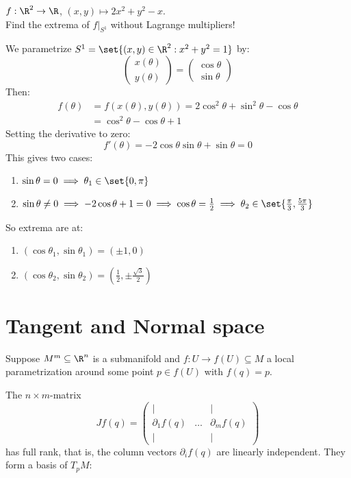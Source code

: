 \begin{example*}
$f: \R^2 \to \R$, $(x,y) \mapsto 2x^2 + y^2 - x$. \\
Find the extrema of $f|_{S^1}$ without Lagrange multipliers!

We parametrize $S^1 = \set{(x,y) \in \R^2 : x^2 + y^2 = 1}$ by:
\[ \begin{pmatrix} x(\theta) \\ y(\theta) \end{pmatrix} = \begin{pmatrix} \cos\theta \\ \sin\theta \end{pmatrix} \]
Then:
\begin{align*}
    f(\theta) &= f(x(\theta), y(\theta)) = 2\cos^2\theta + \sin^2\theta - \cos\theta \\
    &= \cos^2\theta - \cos\theta + 1
\end{align*}
Setting the derivative to zero:
\[ f'(\theta) = -2\cos\theta\sin\theta + \sin\theta = 0 \]
This gives two cases:
\begin{enumerate}
    \item $\sin\theta = 0 \implies \theta_1 \in \set{0, \pi}$
    \item $\sin\theta \ne 0 \implies -2\cos\theta + 1 = 0 \implies \cos\theta = \frac{1}{2} \implies \theta_2 \in \set{\frac{\pi}{3}, \frac{5\pi}{3}}$
\end{enumerate}
So extrema are at:
\begin{enumerate}
    \item $(\cos\theta_1, \sin\theta_1) = (\pm 1, 0)$
    \item $(\cos\theta_2, \sin\theta_2) = \left(\frac{1}{2}, \pm\frac{\sqrt{3}}{2}\right)$
\end{enumerate}
\end{example*}

\section{Tangent and Normal space}

Suppose $M^m \subseteq \R^n$ is a submanifold and $f: U \to f(U) \subseteq M$ a local parametrization around some point $p \in f(U)$ with $f(q) = p$.

The $n \times m$-matrix
\[ Jf(q) = \begin{pmatrix} | & & | \\ \partial_1 f(q) & \dots & \partial_m f(q) \\ | & & | \end{pmatrix} \]
has full rank, that is, the column vectors $\partial_i f(q)$ are linearly independent. They form a basis of $T_p M$:

